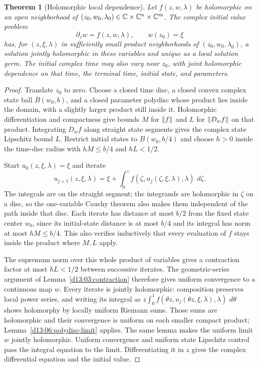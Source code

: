 \documentclass[11pt,oneside]{book}
\newtheorem{theorem}{Theorem}[chapter]
\theoremstyle{definition}
\theoremstyle{remark}\newtheorem{remark}[theorem]{Remark}
\newcommand{\dd}{\,d}\newcommand{\id}{\operatorname{id}}
\begin{document}
\begin{theorem}[Holomorphic local dependence]\label{d13:06:analytic-dependence}
Let $f(z,w,\lambda)$ be holomorphic on an open neighborhood of
$(z_0,w_0,\lambda_0)\in\mathbb C\times\mathbb C^n\times\mathbb C^m$. The complex
initial value problem
\[
 \partial_z w=f(z,w,\lambda),\qquad w(z_0)=\xi
\]
has, for $(z,\xi,\lambda)$ in sufficiently small product
neighborhoods of $(z_0,w_0,\lambda_0)$, a solution jointly
holomorphic in these variables and unique as a local solution germ.
The initial complex time may also vary near $z_0$, with joint
holomorphic dependence on that time, the terminal time, initial state,
and parameters.
\end{theorem}
\begin{proof}
Translate $z_0$ to zero. Choose a closed time disc, a closed convex
complex state ball $\overline B(w_0,b)$, and a closed parameter
polydisc whose product lies inside the domain, with a slightly larger
product still inside it. Holomorphic differentiation and compactness
give bounds $M$ for $\lVert f\rVert$ and $L$ for $\lVert D_w f\rVert$ on that
product. Integrating $D_wf$ along straight state segments gives the
complex state Lipschitz bound $L$. Restrict initial states to
$B(w_0,b/4)$ and choose $h>0$ inside the time-disc radius with
$hM\leq b/4$ and $hL<1/2$.

Start $u_0(z,\xi,\lambda)=\xi$ and iterate
\[
 u_{j+1}(z,\xi,\lambda)=\xi+
       \int_0^z f(\zeta,u_j(\zeta,\xi,\lambda),\lambda)
                   \,\dd\zeta.
\]
The integrals are on the straight segment; the integrands are
holomorphic in $\zeta$ on a disc, so the one-variable Cauchy theorem
also makes them independent of the path inside that disc. Each
iterate has distance at most $b/2$ from the fixed state center $w_0$,
since its initial-state distance is at most $b/4$ and its integral
has norm at most $hM\leq b/4$. This also verifies inductively that
every evaluation of $f$ stays inside the product where $M,L$ apply.

The supremum norm over this whole product of variables gives a
contraction factor at most $hL<1/2$ between successive iterates.
The geometric-series argument of Lemma~\ref{d13:03:contraction}
therefore gives uniform convergence to a continuous map $w$.
Every iterate is jointly holomorphic: composition preserves local
power series, and writing its integral as
$z\int_0^1 f(\theta z,u_j(\theta z,\xi,\lambda),\lambda)\,\dd\theta$
shows holomorphy by locally uniform Riemann sums. Those sums are
holomorphic and their convergence is uniform on each smaller compact
product; Lemma~\ref{d13:06:polydisc-limit} applies.
The same lemma makes the uniform limit $w$ jointly holomorphic.
Uniform convergence and uniform state Lipschitz control pass the
integral equation to the limit. Differentiating it in $z$ gives the
complex differential equation and the initial value.


\end{proof}
\end{document}

